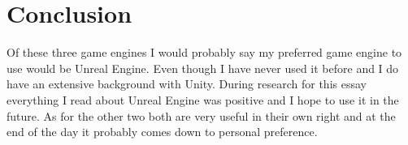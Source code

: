 \documentclass{article}
\begin{document}
\section{Conclusion}
Of these three game engines I would probably say my preferred game engine to use would be Unreal Engine. Even though I have never used it before and I do have an extensive background with Unity. During research for this essay everything I read about Unreal Engine was positive and I hope to use it in the future. As for the other two both are very useful in their own right and at the end of the day it probably comes down to personal preference. 
\end{document}
